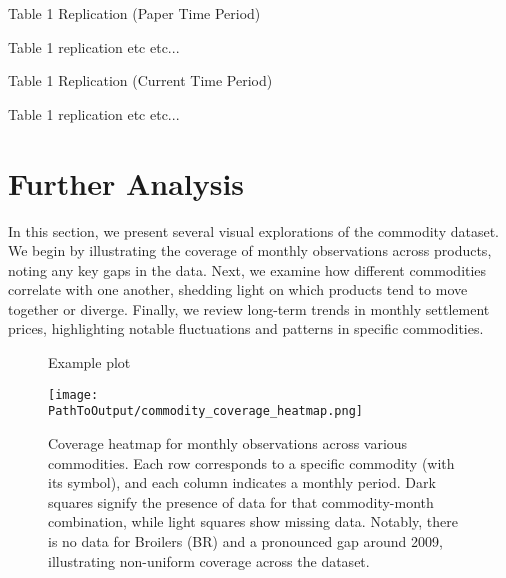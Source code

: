 \documentclass[12pt]{article}
\begin{document}
\begin{table}[ht!]
    \caption{Table 1 Replication (Paper Time Period)}
    \centering
    \begin{adjustbox}{max width=\textwidth}
    
    \end{adjustbox}
    \caption*{
      Table 1 replication etc etc...
    }
    \label{table:paper_table1_replication_paper}
\end{table}

\begin{table}[ht!]
  \caption{Table 1 Replication (Current Time Period)}
  \centering
  \begin{adjustbox}{max width=\textwidth}
  
  \end{adjustbox}
  \caption*{
    Table 1 replication etc etc...
  }
  \label{table:paper_table1_replication_current}
\end{table}

\newpage
\section{Further Analysis}
In this section, we present several visual explorations of the commodity dataset. We begin by illustrating 
the coverage of monthly observations across products, noting any key gaps in the data. Next, we examine 
how different commodities correlate with one another, shedding light on which products tend to move together 
or diverge. Finally, we review long-term trends in monthly settlement prices, highlighting notable fluctuations and 
patterns in specific commodities. 



\begin{figure}[ht!]
  \centering
  \caption{Example plot}
  \begin{adjustbox}{max width=\textwidth}
  \texttt{[image: \\PathToOutput/commodity\_coverage\_heatmap.png]}
  \end{adjustbox}
  \caption*{Coverage heatmap for monthly observations across various commodities. 
  Each row corresponds to a specific commodity (with its symbol), and each column 
  indicates a monthly period. Dark squares signify the presence of data for that commodity-month 
  combination, while light squares show missing data. Notably, there is no data for Broilers (BR) 
  and a pronounced gap around 2009, illustrating non-uniform coverage across the dataset.}
  \label{fig:commodity_coverage_heatmap}
\end{figure}
\end{document}
